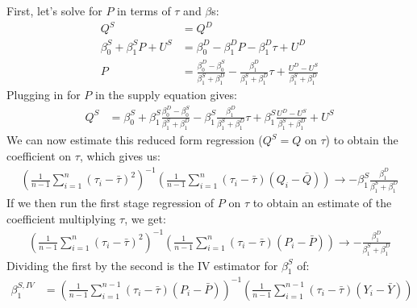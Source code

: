 \documentclass{article}
\begin{document}
\begin{solution}
First, let's solve for $P$ in terms of $\tau$ and $\beta$s:
\begin{align*}
    Q^{S} &= Q^{D}  \\
    \beta_{0}^{S}+\beta_{1}^{S} P+U^{S} &= \beta_{0}^{D}-\beta_{1}^{D}P-\beta_{1}^{D}\tau+U^{D}\\
    P &= \frac{\beta_0^D-\beta_0^S}{\beta_{1}^{S} + \beta_{1}^{D}} 
       - \frac{\beta_1^D}{\beta_{1}^{S} + \beta_{1}^{D}} \tau 
        + \frac{U^D-U^S}{\beta_{1}^{S} + \beta_{1}^{D}} 
\end{align*}
Plugging in for $P$ in the supply equation gives:
\begin{align*}
    Q^{S} &= \beta_0^S + \beta_1^S \frac{\beta_0^D-\beta_0^S}{\beta_{1}^{S} + \beta_{1}^{D}}
        - \beta_1^S \frac{\beta_1^D}{\beta_{1}^{S} + \beta_{1}^{D}} \tau
        + \beta_1^S \frac{U^D-U^S}{\beta_{1}^{S} + \beta_{1}^{D}}  + U^S
\end{align*}
We can now estimate this reduced form regression ($Q^S=Q$ on $\tau$) to obtain the coefficient on $\tau$, which gives us:
\begin{align*}
    \left( \frac{1}{n-1} \sum_{i=1}^n (\tau_i-\bar{\tau})^2  \right)^{-1}\left( \frac{1}{n-1} \sum_{i=1}^n (\tau_i-\bar{\tau})( Q_i - \bar{Q}) \right)  \to
    -\beta_1^S \frac{\beta_1^D}{\beta_{1}^{S} + \beta_{1}^{D}} \tag{$Q$ on $\tau$}
\end{align*}
If we then run the first stage regression of $P$ on $\tau$ to obtain an estimate of the coefficient multiplying $\tau$, we get:
\begin{align*}
   \left( \frac{1}{n-1} \sum_{i=1}^n (\tau_i-\bar{\tau})^2  \right)^{-1} \left(\frac{1}{n-1} \sum_{i=1}^n (\tau_i-\bar{\tau}) ( P_i - \bar{P}) \right)  \to - \frac{\beta_1^D}{\beta_{1}^{S} + \beta_{1}^{D}} \tag{$P$ on $\tau$}
\end{align*}
Dividing the first by the second is the IV estimator for $\beta_1^S$ of:
\begin{align*}
    \beta_1^{S,IV} &= \left(\frac{1}{n-1} \sum_{i=1}^{n-1} (\tau_i-\bar{\tau}) (P_i-\bar{P}) \right)^{-1}\left(\frac{1}{n-1} \sum_{i=1}^{n-1} (\tau_{i}-\bar{\tau})( Y_{i}  - \bar{Y}) \right)
\end{align*}


\end{solution}
\end{document}
